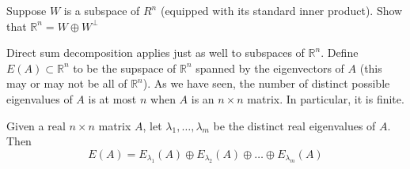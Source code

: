 \documentclass{ximera}
\begin{document}
\begin{exercise} Suppose $W$ is a subspace of $R^n$ (equipped with its standard inner product). Show that $\mathbb R^n = W\oplus W^{\perp}$
\end{exercise}

Direct sum decomposition applies just as well to subspaces of $\mathbb R^n$. Define $E(A)\subset\mathbb R^n$ to be the supspace of $\mathbb R^n$ spanned by the eigenvectors of $A$ (this may or may not be all of $\mathbb R^n$). As we have seen, the number of distinct possible eigenvalues of $A$ is at most $n$ when $A$ is an $n\times n$ matrix. In particular, it is finite.

\begin{theorem} Given a real $n\times n$ matrix $A$, let $\lambda_1,\dots,\lambda_m$ be the distinct real eigenvalues of $A$. Then 
\[
E(A) = E_{\lambda_1}(A)\oplus E_{\lambda_2}(A)\oplus\dots\oplus E_{\lambda_m}(A)
\]
\end{theorem}
\end{document}
